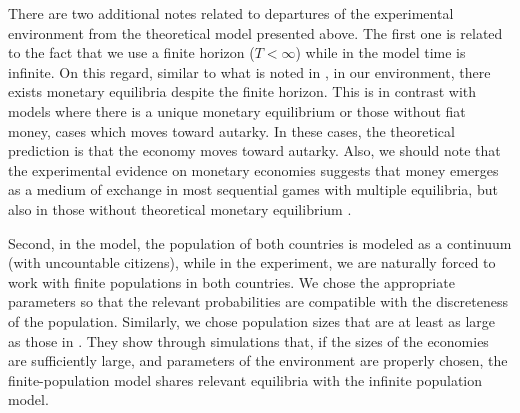 There are two additional notes related to departures of the experimental environment from the theoretical model presented above. The first one is related to the fact that we use a finite horizon ($T<\infty$) while in the model time is infinite. On this regard, similar to what is noted in \cite{JiangZhang}, in our environment, there exists monetary equilibria despite the finite horizon. This is in contrast with models where there is a unique monetary equilibrium or those without fiat money, cases which moves toward autarky. 
In these cases, the theoretical prediction is that the economy moves toward autarky. 
Also, we should note that the experimental evidence on monetary economies suggests that money emerges as a medium of exchange in most sequential games with multiple equilibria, but also in those without theoretical monetary equilibrium \citep{RePEc:fip:fedrwp:19-02}. 

Second, in the model, the population of both countries is modeled as a continuum (with uncountable citizens), while in the experiment, we are naturally forced to work with finite populations in both countries. We chose the appropriate parameters so that the relevant probabilities are compatible with the discreteness of the population. 
Similarly, we chose population sizes that are at least as large as those in \cite{JiangZhang}. They show through simulations that, if the sizes of the economies are sufficiently large, and parameters of the environment are properly chosen, the finite-population model shares relevant equilibria with the infinite population model.

